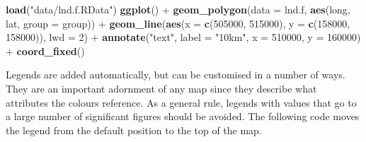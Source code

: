 \documentclass[]{article}
\newenvironment{Shaded}{}{}
\newcommand{\KeywordTok}[1]{\textcolor[rgb]{0.00,0.44,0.13}{\textbf{{#1}}}}
\newcommand{\DataTypeTok}[1]{\textcolor[rgb]{0.56,0.13,0.00}{{#1}}}
\newcommand{\DecValTok}[1]{\textcolor[rgb]{0.25,0.63,0.44}{{#1}}}
\newcommand{\StringTok}[1]{\textcolor[rgb]{0.25,0.44,0.63}{{#1}}}
\newcommand{\NormalTok}[1]{{#1}}
\begin{document}
\begin{Shaded}
\begin{Highlighting}[]
\KeywordTok{load}\NormalTok{(}\StringTok{"data/lnd.f.RData"}\NormalTok{)}
\KeywordTok{ggplot}\NormalTok{() + }\KeywordTok{geom_polygon}\NormalTok{(}\DataTypeTok{data =} \NormalTok{lnd.f, }\KeywordTok{aes}\NormalTok{(long, lat, }\DataTypeTok{group =} \NormalTok{group)) + }\KeywordTok{geom_line}\NormalTok{(}\KeywordTok{aes}\NormalTok{(}\DataTypeTok{x =} \KeywordTok{c}\NormalTok{(}\DecValTok{505000}\NormalTok{, }
    \DecValTok{515000}\NormalTok{), }\DataTypeTok{y =} \KeywordTok{c}\NormalTok{(}\DecValTok{158000}\NormalTok{, }\DecValTok{158000}\NormalTok{)), }\DataTypeTok{lwd =} \DecValTok{2}\NormalTok{) + }\KeywordTok{annotate}\NormalTok{(}\StringTok{"text"}\NormalTok{, }\DataTypeTok{label =} \StringTok{"10km"}\NormalTok{, }
    \DataTypeTok{x =} \DecValTok{510000}\NormalTok{, }\DataTypeTok{y =} \DecValTok{160000}\NormalTok{) + }\KeywordTok{coord_fixed}\NormalTok{()}
\end{Highlighting}
\end{Shaded}


Legends are added automatically, but can be customised in a number of
ways. They are an important adornment of any map since they describe
what attributes the colours reference. As a general rule, legends with values that go to a large number of significant figures should be avoided. The following code moves the legend from the default position to the top of the map.
\end{document}
